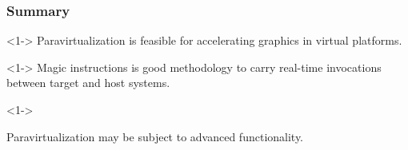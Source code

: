 
\begin{frame}
\frametitle{Summary}

\begin{thm}<1->
	Paravirtualization is feasible for accelerating graphics in virtual platforms.
\end{thm}

\begin{thm}<1->
	Magic instructions is good methodology to carry real-time invocations between target and host systems.
\end{thm}

\begin{thm}<1->
	\begin{graytext}
		Paravirtualization may be subject to advanced functionality.
	\end{graytext}
\end{thm}

\end{frame}
